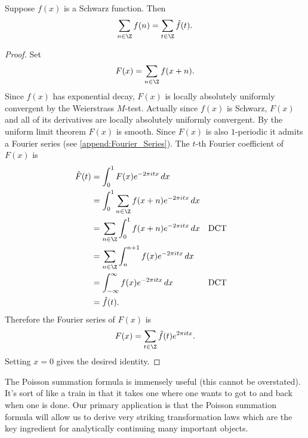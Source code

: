         \begin{theorem}
          Suppose $f(x)$ is a Schwarz function. Then
          \[
            \sum_{n \in \Z}f(n) = \sum_{t \in \Z}\hat{f}(t).
          \]
        \end{theorem}
        \begin{proof}
          Set
          \[
            F(x) = \sum_{n \in \Z}f(x+n).
          \]
          Since $f(x)$ has exponential decay, $F(x)$ is locally absolutely uniformly convergent by the Weierstrass $M$-test. Actually since $f(x)$ is Schwarz, $F(x)$ and all of its derivatives are locally absolutely uniformly convergent. By the uniform limit theorem $F(x)$ is smooth. Since $F(x)$ is also $1$-periodic it admits a Fourier series (see \cref{append:Fourier_Series}). The $t$-th Fourier coefficient of $F(x)$ is
          \begin{align*}
            \hat{F}(t) &= \int_{0}^{1}F(x)e^{-2\pi itx}\,dx \\
            &= \int_{0}^{1}\sum_{n \in \Z}f(x+n)e^{-2\pi itx}\,dx \\
            &= \sum_{n \in \Z}\int_{0}^{1}f(x+n)e^{-2\pi itx}\,dx && \text{DCT} \\
            &= \sum_{n \in \Z}\int_{n}^{n+1}f(x)e^{-2\pi itx}\,dx \\
            &= \int_{-\infty}^{\infty}f(x)e^{-2\pi itx}\,dx && \text{DCT} \\
            &= \hat{f}(t).
          \end{align*}
          Therefore the Fourier series of $F(x)$ is
          \[
            F(x) = \sum_{t \in \Z}\hat{f}(t)e^{2\pi itx}.
          \]
          Setting $x = 0$ gives the desired identity.
        \end{proof}

        The Poisson summation formula is immensely useful (this cannot be overstated). It's sort of like a train in that it takes one where one wants to got to and back when one is done. Our primary application is that the Poisson summation formula will allow us to derive very striking transformation laws which are the key ingredient for analytically continuing many important objects.
